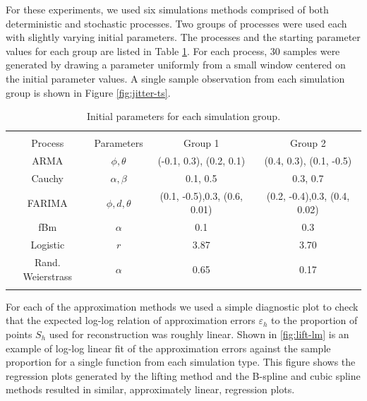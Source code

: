 For these experiments, we used six simulations methods comprised of both deterministic and stochastic processes. Two groups of processes
were used each with slightly varying initial parameters. The processes and the starting 
parameter values for each group are listed in Table \ref{tab:sim-params}. 
For each process, 30 samples were generated by drawing 
a parameter uniformly from a small window centered on the initial
parameter values. A single sample observation from each simulation group is shown in Figure \ref{fig:jitter-ts}.


\begin{table}[!htbp] \centering 
\begin{tabular}{@{\extracolsep{-6pt}} cccc} 
\\[-1.8ex]\hline 
\hline \\[-1.8ex] 
  Process  & Parameters  & Group 1 & Group 2  \\ \hline 
ARMA        & $\phi,\theta $  
            & (-0.1, 0.3), (0.2, 0.1)
            & (0.4, 0.3), (0.1, -0.5)     \\ 
Cauchy      & $\alpha, \beta$   
            & 0.1, 0.5   
            & 0.3, 0.7   \\ 
FARIMA      & $\phi,d,\theta$   
            &  (0.1, -0.5),0.3, (0.6, 0.01) 
            & (0.2, -0.4),0.3, (0.4, 0.02)  \\ 
fBm         & $\alpha$   
            & 0.1   
            & 0.3  \\ 
Logistic    & $r$       
            & 3.87   
            & 3.70 \\ 
Rand. Weierstrass &  $\alpha$  & 0.65  & 0.17  \\ 
\hline \\[-1.8ex] 
          \end{tabular} 
  \caption{Initial parameters for each simulation group.}
  \label{tab:sim-params}
\end{table}


For each of the approximation methods we used a 
simple diagnostic plot to check that 
the expected log-log relation of approximation errors $\varepsilon_h$
to the proportion of points $S_h$ used for reconstruction was 
roughly linear. 
Shown in \ref{fig:lift-lm} is an example of log-log linear fit of the approximation errors against the sample proportion for a single function from each simulation type. This figure shows the regression plots generated by the lifting method and the B-spline and cubic spline methods 
resulted in similar, approximately linear, regression plots. 


